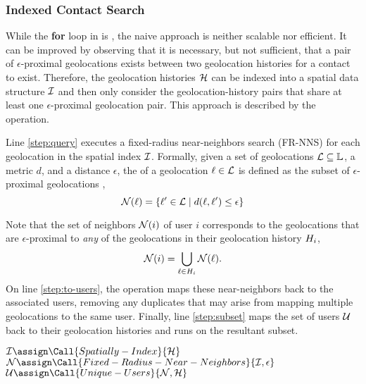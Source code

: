 \subsubsection{Indexed Contact Search}
While the \textbf{for} loop in  is  \cite[p. 14]{Herlihy2012}, the naive approach is neither scalable nor efficient. It can be improved by observing that it is necessary, but not sufficient, that a pair of $\epsilon$-proximal geolocations exists between two geolocation histories for a contact to exist. Therefore, the geolocation histories $\mathcal{H}$ can be indexed into a spatial data structure $\mathcal{I}$ \cite{Mokbel2003, Dinh2010, Mahmood2019} and then only consider the geolocation-history pairs that share at least one $\epsilon$-proximal geolocation pair. This approach is described by the  operation.

Line \ref{step:query} executes a fixed-radius near-neighbors search (FR-NNS) \cite{Bentley1975, Brin1995} for each geolocation in the spatial index $\mathcal{I}$. Formally, given a set of geolocations $\mathcal{L} \subseteq \mathbb{L}$, a metric $d$, and a distance $\epsilon$, the  of a geolocation $\ell \in \mathcal{L}$ is defined as the subset of $\epsilon$-proximal geolocations \cite{Brin1995},
	\begin{equation*}
		\mathcal{N}(\ell) = \{\ell' \in \mathcal{L} \mid d(\ell, \ell') \leq \epsilon\}
	\end{equation*}

Note that the set of neighbors $\mathcal{N}(i)$ of user $i$ corresponds to the geolocations that are $\epsilon$-proximal to \emph{any} of the geolocations in their geolocation history $H_i$,
	\begin{equation*}
		\mathcal{N}(i) = \bigcup_{\ell \in H_i} \mathcal{N}(\ell).
	\end{equation*}
On line \ref{step:to-users}, the operation  maps these near-neighbors back to the associated users, removing any duplicates that may arise from mapping multiple geolocations to the same user. Finally, line \ref{step:subset} maps the set of users $\mathcal{U}$ back to their geolocation histories and runs  on the resultant subset.
	\begin{algorithm}[ht!]
	\begin{algorithmic}[1]
		\State $\sindex \assign \Call{Spatially-Index}{\histories}$
		\State $\query \assign \Call{Fixed-Radius-Near-Neighbors}{\sindex, \epsilon}$ \label{step:query}
		\State $\users \assign \Call{Unique-Users}{\query, \histories}$ \label{step:to-users}
		\State \Return {} \label{step:subset}
	\end{algorithmic}
	\end{algorithm}

